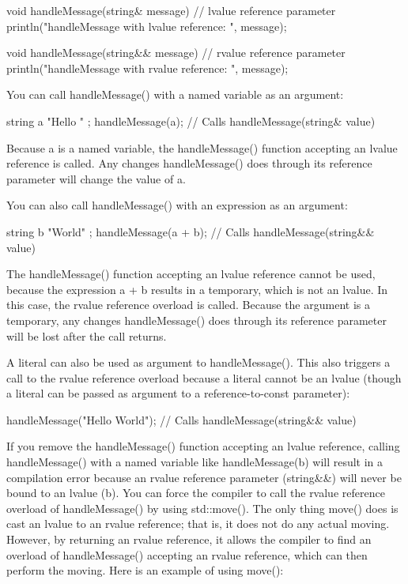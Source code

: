\begin{cpp}
void handleMessage(string& message) // lvalue reference parameter
{
    println("handleMessage with lvalue reference: {}", message);
}

void handleMessage(string&& message) // rvalue reference parameter
{
    println("handleMessage with rvalue reference: {}", message);
}
\end{cpp}

You can call handleMessage() with a named variable as an argument:

\begin{cpp}
string a { "Hello " };
handleMessage(a); // Calls handleMessage(string& value)
\end{cpp}

Because a is a named variable, the handleMessage() function accepting an lvalue reference is called. Any changes handleMessage() does through its reference parameter will change the value of a.

You can also call handleMessage() with an expression as an argument:

\begin{cpp}
string b { "World" };
handleMessage(a + b); // Calls handleMessage(string&& value)
\end{cpp}

The handleMessage() function accepting an lvalue reference cannot be used, because the expression a + b results in a temporary, which is not an lvalue. In this case, the rvalue reference overload is called. Because the argument is a temporary, any changes handleMessage() does through its reference parameter will be lost after the call returns.

A literal can also be used as argument to handleMessage(). This also triggers a call to the rvalue reference overload because a literal cannot be an lvalue (though a literal can be passed as argument to a reference-to-const parameter):

\begin{cpp}
handleMessage("Hello World"); // Calls handleMessage(string&& value)
\end{cpp}

If you remove the handleMessage() function accepting an lvalue reference, calling handleMessage() with a named variable like handleMessage(b) will result in a compilation error because an rvalue reference parameter (string\&\&) will never be bound to an lvalue (b). You can force the compiler to call the rvalue reference overload of handleMessage() by using std::move(). The only thing move() does is cast an lvalue to an rvalue reference; that is, it does not do any actual moving. However, by returning an rvalue reference, it allows the compiler to find an overload of handleMessage() accepting an rvalue reference, which can then perform the moving. Here is an example of using move():

